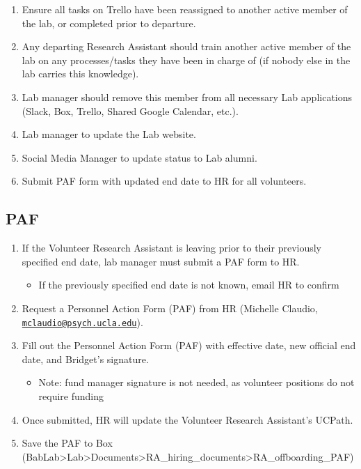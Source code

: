 \documentclass[]{book}
\providecommand{\tightlist}{%
  \setlength{\itemsep}{0pt}\setlength{\parskip}{0pt}}
\begin{document}
\begin{enumerate}
\def\labelenumi{\arabic{enumi}.}
\tightlist
\item
  Ensure all tasks on Trello have been reassigned to another active member of the lab, or completed prior to departure.
\item
  Any departing Research Assistant should train another active member of the lab on any processes/tasks they have been in charge of (if nobody else in the lab carries this knowledge).
\item
  Lab manager should remove this member from all necessary Lab applications (Slack, Box, Trello, Shared Google Calendar, etc.).
\item
  Lab manager to update the Lab website.
\item
  Social Media Manager to update status to Lab alumni.
\item
  Submit PAF form with updated end date to HR for all volunteers.
\end{enumerate}

\hypertarget{paf}{%
\subsection{PAF}\label{paf}}

\begin{enumerate}
\def\labelenumi{\arabic{enumi}.}
\tightlist
\item
  If the Volunteer Research Assistant is leaving prior to their previously specified end date, lab manager must submit a PAF form to HR.

  \begin{itemize}
  \tightlist
  \item
    If the previously specified end date is not known, email HR to confirm
  \end{itemize}
\item
  Request a Personnel Action Form (PAF) from HR (Michelle Claudio, \href{mailto:mclaudio@psych.ucla.edu}{\nolinkurl{mclaudio@psych.ucla.edu}}).
\item
  Fill out the Personnel Action Form (PAF) with effective date, new official end date, and Bridget's signature.

  \begin{itemize}
  \tightlist
  \item
    Note: fund manager signature is not needed, as volunteer positions do not require funding
  \end{itemize}
\item
  Once submitted, HR will update the Volunteer Research Assistant's UCPath.
\item
  Save the PAF to Box (BabLab\textgreater{}Lab\textgreater{}Documents\textgreater{}RA\_hiring\_documents\textgreater{}RA\_offboarding\_PAF)
\end{enumerate}
\end{document}
